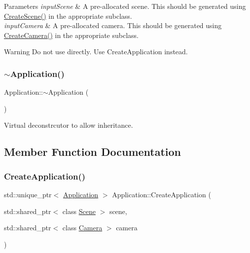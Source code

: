 \begin{DoxyParams}{Parameters}
{\em input\+Scene} & A pre-\/allocated scene. This should be generated using \hyperlink{class_application_a511e638cf5748e10151f17d6140b9119}{Create\+Scene()} in the appropriate subclass. \\
\hline
{\em input\+Camera} & A pre-\/allocated camera. This should be generated using \hyperlink{class_application_a53c0a539fd2c4fe2cc48143cc0a3ea24}{Create\+Camera()} in the appropriate subclass. \\
\hline
\end{DoxyParams}
\begin{DoxyWarning}{Warning}
Do not use directly. Use Create\+Application instead. 
\end{DoxyWarning}
\hypertarget{class_application_a748bca84fefb9c12661cfaa2f623748d}{}\label{class_application_a748bca84fefb9c12661cfaa2f623748d} 
\subsubsection{\texorpdfstring{$\sim$\+Application()}{~Application()}}
{\footnotesize\ttfamily Application\+::$\sim$\+Application (\begin{DoxyParamCaption}{ }\end{DoxyParamCaption})\hspace{0.3cm}{\ttfamily [virtual]}}



Virtual deconstrcutor to allow inheritance. 



\subsection{Member Function Documentation}
\hypertarget{class_application_a727f63f898a68bddf6d88309195ef194}{}\label{class_application_a727f63f898a68bddf6d88309195ef194} 
\subsubsection{\texorpdfstring{Create\+Application()}{CreateApplication()}}
{\footnotesize\ttfamily std\+::unique\+\_\+ptr$<$ \hyperlink{class_application}{Application} $>$ Application\+::\+Create\+Application (\begin{DoxyParamCaption}\item[{std\+::shared\+\_\+ptr$<$ class \hyperlink{class_scene}{Scene} $>$}]{scene,  }\item[{std\+::shared\+\_\+ptr$<$ class \hyperlink{class_camera}{Camera} $>$}]{camera }\end{DoxyParamCaption})\hspace{0.3cm}{\ttfamily [static]}}



